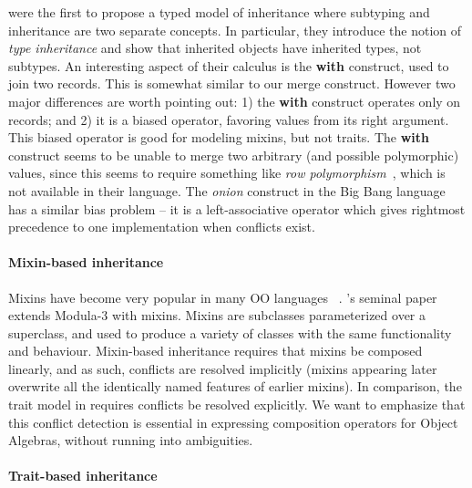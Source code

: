 \citet{cook1989inheritance} were the first to propose a typed model of
inheritance where subtyping and inheritance are two separate concepts. In
particular, they introduce the notion of \textit{type inheritance} and show that
inherited objects have inherited types, not subtypes. An interesting aspect of
their calculus is the \textbf{with} construct, used to join two records. This is
somewhat similar to our merge construct. However two major differences are worth
pointing out: 1) the \textbf{with} construct operates only on records; and 2) it
is a biased operator, favoring values from its right argument. This biased
operator is good for modeling mixins, but not traits. The
\textbf{with} construct seems to be unable to merge two arbitrary (and possible
polymorphic) values, since this seems to require something like
\emph{row polymorphism}~\cite{}, which is not available in their language. 
The \textit{onion} construct in the Big Bang
language~\cite{palmer2015building,menon2012big} has a similar bias problem -- it is a
left-associative operator which gives rightmost precedence to one
implementation when conflicts exist.

\paragraph{Mixin-based inheritance}

Mixins have become very popular in many OO languages
~\cite{flatt1998classes,bono1999core, ancona2003jam}. \citeauthor{bracha1990mixin}'s
seminal paper~\citep{bracha1990mixin} extends Modula-3 with mixins. Mixins are subclasses parameterized
over a superclass, and used to produce a variety of classes with the same
functionality and behaviour. Mixin-based inheritance requires that mixins be
composed linearly, and as such, conflicts are resolved implicitly (mixins
appearing later overwrite all the identically named features of earlier mixins).
In comparison, the trait model in \name requires conflicts be resolved
explicitly. We want to emphasize that this conflict detection is essential in
expressing composition operators for Object Algebras, without running
into ambiguities.


\paragraph{Trait-based inheritance}

